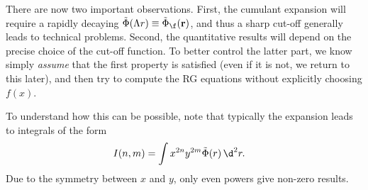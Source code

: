 \documentclass[english, parskip=full]{scrartcl}
\begin{document}
There are now two important observations.
First, the cumulant expansion will require a rapidly decaying $\tilde{\Phi}(\Lambda r) \equiv \tilde{\Phi}_\f(\textbf{r})$, and thus a sharp cut-off generally leads to technical problems.
Second, the quantitative results will depend on the precise choice of the cut-off function.
To better control the latter part, we know simply \emph{assume} that the first property is satisfied (even if it is not, we return to this later), and then try to compute the RG equations without explicitly choosing $f(x)$.

To understand how this can be possible, note that typically the expansion leads to integrals of the form
\begin{align}
I(n,m) &= \int x^{2n}y^{2m} \tilde{\Phi}(r)\,\d^2r.
\end{align}
Due to the symmetry between $x$ and $y$, only even powers give non-zero results.
\end{document}

